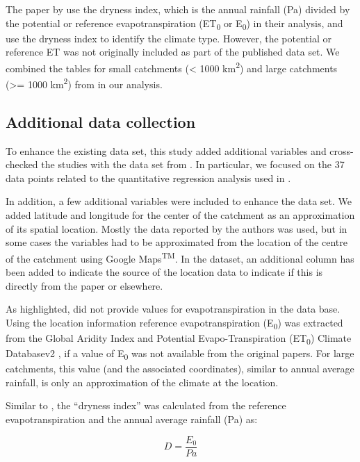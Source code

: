 \documentclass[]{elsarticle} %
\begin{document}
The paper by \citet{zhang2017} use the dryness index, which is the annual rainfall (Pa) divided by the potential or reference evapotranspiration (ET\textsubscript{0} or E\textsubscript{0}) in their analysis, and use the dryness index to identify the climate type. However, the potential or reference ET was not originally included as part of the published data set. We combined the tables for small catchments (\textless{} 1000 km\textsuperscript{2}) and large catchments (\textgreater= 1000 km\textsuperscript{2}) from \citet{zhang2017} in our analysis.

\hypertarget{additional-data-collection}{%
\subsection{Additional data collection}\label{additional-data-collection}}

To enhance the existing data set, this study added additional variables and cross-checked the studies with the data set from \citet{filoso2017}. In particular, we focused on the 37 data points related to the quantitative regression analysis used in \citet{filoso2017}.

In addition, a few additional variables were included to enhance the data set. We added latitude and longitude for the center of the catchment as an approximation of its spatial location. Mostly the data reported by the authors was used, but in some cases the variables had to be approximated from the location of the centre of the catchment using Google Maps\textsuperscript{TM}. In the dataset, an additional column has been added to indicate the source of the location data to indicate if this is directly from the paper or elsewhere.

As highlighted, \citet{zhang2017} did not provide values for evapotranspiration in the data base. Using the location information reference evapotranspiration (E\textsubscript{0}) was extracted from the Global Aridity Index and Potential Evapo-Transpiration (ET\textsubscript{0}) Climate Databasev2 \citep{trabucco2018}, if a value of E\textsubscript{0} was not available from the original papers. For large catchments, this value (and the associated coordinates), similar to annual average rainfall, is only an approximation of the climate at the location.

Similar to \citet{zhang2017}, the ``dryness index'' was calculated from the reference evapotranspiration and the annual average rainfall (Pa) as:

\begin{equation}
D = \frac{E_{0}}{Pa} \label{eq:eq1}
\end{equation}
\end{document}
